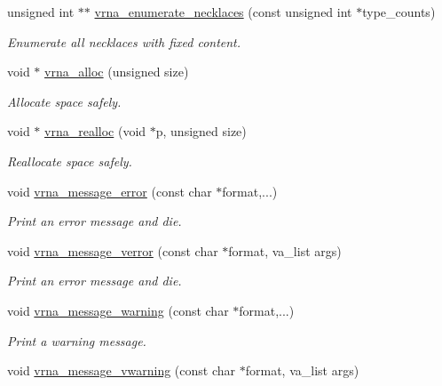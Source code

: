 \begin{DoxyCompactItemize}
\item 
unsigned int $\ast$$\ast$ \hyperlink{group__utils_gae081ac655a76bd5c4b3d86c60b096b75}{vrna\+\_\+enumerate\+\_\+necklaces} (const unsigned int $\ast$type\+\_\+counts)
\begin{DoxyCompactList}\small\item\em Enumerate all necklaces with fixed content. \end{DoxyCompactList}\end{DoxyCompactItemize}
\begin{DoxyCompactItemize}
\item 
void $\ast$ \hyperlink{group__utils_gaf37a0979367c977edfb9da6614eebe99}{vrna\+\_\+alloc} (unsigned size)
\begin{DoxyCompactList}\small\item\em Allocate space safely. \end{DoxyCompactList}\item 
void $\ast$ \hyperlink{group__utils_ga27f4719a66c6f90d1cca3d1e6e696c6a}{vrna\+\_\+realloc} (void $\ast$p, unsigned size)
\begin{DoxyCompactList}\small\item\em Reallocate space safely. \end{DoxyCompactList}\item 
void \hyperlink{group__utils_ga36b35be01d7f36cf7f59c245eee628d1}{vrna\+\_\+message\+\_\+error} (const char $\ast$format,...)
\begin{DoxyCompactList}\small\item\em Print an error message and die. \end{DoxyCompactList}\item 
void \hyperlink{group__utils_gabc1a08dea0d84b5c33701732172a8b18}{vrna\+\_\+message\+\_\+verror} (const char $\ast$format, va\+\_\+list args)
\begin{DoxyCompactList}\small\item\em Print an error message and die. \end{DoxyCompactList}\item 
void \hyperlink{group__utils_ga6e07ed24add60693ba886d54d0a46635}{vrna\+\_\+message\+\_\+warning} (const char $\ast$format,...)
\begin{DoxyCompactList}\small\item\em Print a warning message. \end{DoxyCompactList}\item 
void \hyperlink{group__utils_ga377aa8ec8a49d343063adb22e6311f26}{vrna\+\_\+message\+\_\+vwarning} (const char $\ast$format, va\+\_\+list args)

\end{DoxyCompactItemize}
